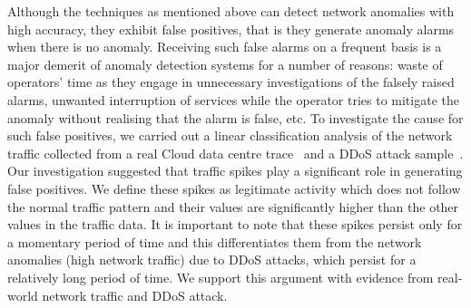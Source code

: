 Although the techniques as mentioned above can detect network anomalies with high accuracy, they exhibit false positives, that is they generate anomaly alarms when there is no anomaly. Receiving such false alarms on a frequent basis is a major demerit of anomaly detection systems for a number of reasons: waste of operators' time as they engage in unnecessary investigations of the falsely raised alarms, unwanted interruption of services while the operator tries to mitigate the anomaly without realising that the alarm is false, etc. To investigate the cause for such false positives, we carried out a linear classification analysis of the network traffic collected from a real Cloud data centre trace~\cite{workloadCCGRID:2015} and a DDoS attack sample~\cite{caida}. 
Our investigation suggested that traffic spikes play a significant role in generating false positives. We define these spikes as legitimate activity which does not follow the normal traffic pattern and their values are significantly higher than the other values in the traffic data. 
It is important to note that these spikes persist only for a momentary period of time and this differentiates them from the network anomalies (high network traffic) due to DDoS attacks, which persist for a relatively long period of time. We support this argument with evidence from real-world network traffic and DDoS attack. 
